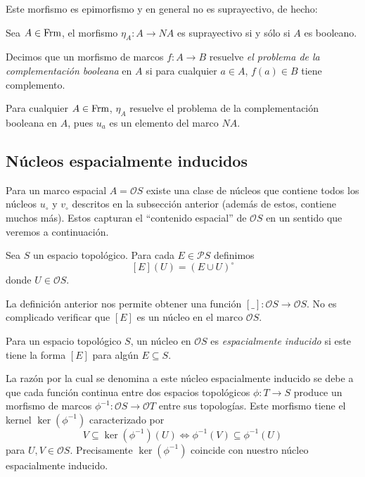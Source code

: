 Este morfismo es epimorfismo y en general no es suprayectivo, de hecho:

\begin{lem}
Sea $A\in \mathrm{Frm}$, el morfismo $\eta_A\colon A\to NA$ es suprayectivo si y sólo si $A$ es booleano.
\end{lem}

\begin{dfn}
Decimos que un morfismo de marcos $f\colon A\to B$ resuelve \emph{el problema de la complementación booleana} en $A$ si para cualquier $a\in A$, $f(a)\in B$ tiene complemento.
\end{dfn}

Para cualquier $A\in \mathrm{Frm}$, $\eta_A$ resuelve el problema de la complementación booleana en $A$, pues $u_a$ es un elemento del marco $NA$.

\subsection{Núcleos espacialmente inducidos}

Para un marco espacial $A=\mathcal{O}S$ existe una clase de núcleos que contiene todos los núcleos $u_\circ$ y $v_\circ$ descritos en la subsección anterior (además de estos, contiene muchos más). Estos capturan el ``contenido espacial'' de $\mathcal{O}S$ en un sentido que veremos a continuación.

\begin{dfn}\label{Definicion5.3.1}
    Sea $S$ un espacio topológico. Para cada $E\in \mathcal{P}S$ definimos 
    \[
    [E](U)=(E\cup U)^\circ
    \]
    donde $U\in \mathcal{O}S$.
\end{dfn}

La definición anterior nos permite obtener una función $[ \_ ]\colon \mathcal{O}S\to \mathcal{O}S$. No es complicado verificar que $[E]$ es un núcleo en el marco $\mathcal{O}S$.

\begin{dfn}\label{Definicon5.3.2}
    Para un espacio topológico $S$, un núcleo en $\mathcal{O}S$ es \emph{espacialmente inducido} si este tiene la forma $[E]$ para algún $E\subseteq S$.
\end{dfn}

La razón por la cual se denomina a este núcleo espacialmente inducido se debe a que cada función continua entre dos espacios topológicos $\phi\colon T\to S$ produce un morfismo de marcos $\phi^{-1}\colon \mathcal{O}S \to \mathcal{O}T$ entre sus topologías. Este morfismo tiene el kernel $\ker(\phi^{-1})$ caracterizado por 
\[
V\subseteq \ker(\phi^{-1})(U)\Leftrightarrow \phi^{-1}(V)\subseteq \phi^{-1}(U)
\]
para $U, V\in \mathcal{O}S$. Precisamente $\ker(\phi^{-1})$ coincide con nuestro núcleo espacialmente inducido.

